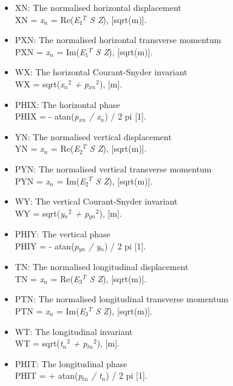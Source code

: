 \begin{itemize}
	\item XN: The normalised horizontal displacement\\
          XN = \textit{x$_n$} = Re(\textit{E$_1$$^T$ S Z}), [sqrt(m)]. 
	\item PXN: The normalised horizontal transverse momentum \\    
          PXN = \textit{x$_n$} = Im(\textit{E$_1$$^T$ S Z}), [sqrt(m)].     
	\item WX: The horizontal Courant-Snyder invariant \\
          WX = sqrt(\textit{x$_n$$^2$ + p$_{xn}$$^2$}), [m].    
	\item PHIX: The horizontal phase \\    
          PHIX = - atan(\textit{p$_{xn}$ / x$_n$}) / 2 pi [1].      
	\item YN: The normalised vertical displacement \\
          YN = \textit{x$_n$} = Re(\textit{E$_2$$^T$ S Z}), [sqrt(m)].     
	\item PYN: The normalised vertical transverse momentum \\ 
          PYN = \textit{x$_n$} = Im(\textit{E$_2$$^T$ S Z}), [sqrt(m)].     
	\item WY: The vertical Courant-Snyder invariant \\
          WY = sqrt(\textit{y$_n$$^2$ + p$_{yn}$$^2$}), [m].     
	\item PHIY: The vertical phase \\ 
          PHIY = - atan(\textit{p$_{yn}$ / y$_n$}) / 2 pi [1].     
	\item TN: The normalised longitudinal displacement \\     
          TN = \textit{x$_n$} = Re(\textit{E$_3$$^T$ S Z}), [sqrt(m)].     
	\item PTN: The normalised longitudinal transverse momentum \\    
          PTN = \textit{x$_n$} = Im(\textit{E$_3$$^T$ S Z}), [sqrt(m)].     
	\item WT: The longitudinal invariant \\    
          WT = sqrt(\textit{t$_n$$^2$ + p$_{tn}$$^2$}), [m].     
	\item PHIT: The longitudinal phase \\    
          PHIT = + atan(\textit{p$_{tn}$ / t$_n$}) / 2 pi [1].     
\end{itemize} 

